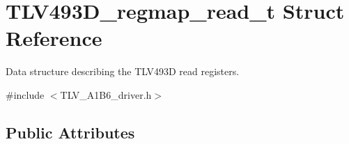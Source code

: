 \hypertarget{struct_t_l_v493_d__regmap__read__t}{}\section{T\+L\+V493\+D\+\_\+regmap\+\_\+read\+\_\+t Struct Reference}
\label{struct_t_l_v493_d__regmap__read__t}


Data structure describing the T\+L\+V493D read registers.  




{\ttfamily \#include $<$T\+L\+V\+\_\+\+A1\+B6\+\_\+driver.\+h$>$}

\subsection*{Public Attributes}
